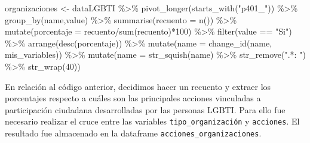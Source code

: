 \documentclass[
]{book}
\newenvironment{Shaded}{\begin{snugshade}}{\end{snugshade}}
\newcommand{\AttributeTok}[1]{\textcolor[rgb]{0.77,0.63,0.00}{#1}}
\newcommand{\DecValTok}[1]{\textcolor[rgb]{0.00,0.00,0.81}{#1}}
\newcommand{\FunctionTok}[1]{\textcolor[rgb]{0.00,0.00,0.00}{#1}}
\newcommand{\NormalTok}[1]{#1}
\newcommand{\OtherTok}[1]{\textcolor[rgb]{0.56,0.35,0.01}{#1}}
\newcommand{\SpecialCharTok}[1]{\textcolor[rgb]{0.00,0.00,0.00}{#1}}
\newcommand{\StringTok}[1]{\textcolor[rgb]{0.31,0.60,0.02}{#1}}
\theoremstyle{definition}
\theoremstyle{definition}
\theoremstyle{definition}
\theoremstyle{definition}
\theoremstyle{remark}
\begin{document}
\begin{Shaded}
\begin{Highlighting}[]
\NormalTok{organizaciones }\OtherTok{\textless{}{-}}\NormalTok{ dataLGBTI }\SpecialCharTok{\%\textgreater{}\%} 
  \FunctionTok{pivot\_longer}\NormalTok{(}\FunctionTok{starts\_with}\NormalTok{(}\StringTok{"p401\_"}\NormalTok{)) }\SpecialCharTok{\%\textgreater{}\%} 
  \FunctionTok{group\_by}\NormalTok{(name,value) }\SpecialCharTok{\%\textgreater{}\%} 
  \FunctionTok{summarise}\NormalTok{(}\AttributeTok{recuento =} \FunctionTok{n}\NormalTok{()) }\SpecialCharTok{\%\textgreater{}\%} 
  \FunctionTok{mutate}\NormalTok{(}\AttributeTok{porcentaje =}\NormalTok{ recuento}\SpecialCharTok{/}\FunctionTok{sum}\NormalTok{(recuento)}\SpecialCharTok{*}\DecValTok{100}\NormalTok{) }\SpecialCharTok{\%\textgreater{}\%} 
  \FunctionTok{filter}\NormalTok{(value }\SpecialCharTok{==} \StringTok{"Si"}\NormalTok{) }\SpecialCharTok{\%\textgreater{}\%} 
  \FunctionTok{arrange}\NormalTok{(}\FunctionTok{desc}\NormalTok{(porcentaje)) }\SpecialCharTok{\%\textgreater{}\%} 
  \FunctionTok{mutate}\NormalTok{(}\AttributeTok{name =} \FunctionTok{change\_id}\NormalTok{(name, mis\_variables)) }\SpecialCharTok{\%\textgreater{}\%} 
  \FunctionTok{mutate}\NormalTok{(}\AttributeTok{name =} \FunctionTok{str\_squish}\NormalTok{(name) }\SpecialCharTok{\%\textgreater{}\%} \FunctionTok{str\_remove}\NormalTok{(}\StringTok{".*: "}\NormalTok{) }\SpecialCharTok{\%\textgreater{}\%} \FunctionTok{str\_wrap}\NormalTok{(}\DecValTok{40}\NormalTok{))}
\end{Highlighting}
\end{Shaded}

En relación al código anterior, decidimos hacer un recuento y extraer los porcentajes respecto a cuáles son las principales acciones vinculadas a participación ciudadana desarrolladas por las personas LGBTI. Para ello fue necesario realizar el cruce entre las variables \texttt{tipo\_organización} y \texttt{acciones}. El resultado fue almacenado en la dataframe \texttt{acciones\_organizaciones}.
\end{document}
